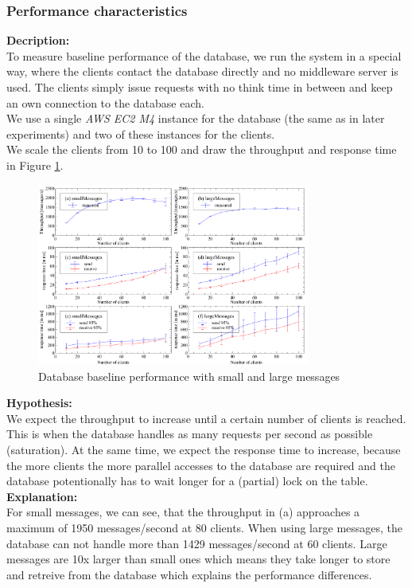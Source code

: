 \documentclass[11pt]{article}
\begin{document}
\subsubsection{Performance characteristics}\label{sec:performance-characteristics}
\textbf{Decription:}\\
To measure baseline performance of the database, we run the system in a special way, where the clients contact the database directly and no middleware server is used. The clients simply issue requests with no think time in between and keep an own connection to the database each.\\
We use a single \textit{AWS EC2 M4} instance for the database (the same as in later experiments) and two of these instances for the clients.\\
We scale the clients from 10 to 100 and draw the throughput and response time in Figure \ref{fig:dbonly}.\\
\begin{figure}
  \begin{center}
    \includegraphics[width=0.8\textwidth]{../results/dbonly.pdf}
    \caption{Database baseline performance with small and large messages}
    \label{fig:dbonly}
  \end{center}
\end{figure}
\textbf{Hypothesis:}\\
We expect the throughput to increase until a certain number of clients is reached. This is when the database handles as many requests per second as possible (saturation). At the same time, we expect the response time to increase, because the more clients the more parallel accesses to the database are required and the database potentionally has to wait longer for a (partial) lock on the table.\\
\textbf{Explanation:}\\
For small messages, we can see, that the throughput in (a) approaches a maximum of 1950 messages/second at 80 clients. When using large messages, the database can not handle more than 1429 messages/second at 60 clients. Large messages are 10x larger than small ones which means they take longer to store and retreive from the database which explains the performance differences.
\end{document}
